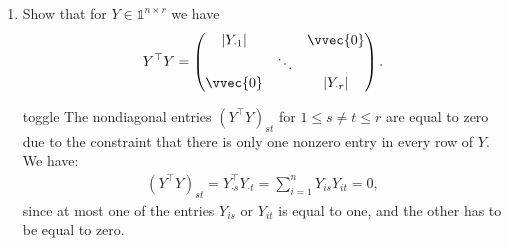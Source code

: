 \documentclass[letterpaper,10pt,english]{jupyterBook}
\begin{document}
\begin{enumerate}
\begin{sphinxuseclass}{toggle}
\sphinxAtStartPar
Now we update the centroids and compute the mean value of the data points which are in one cluster. For example, the first data point is the only point which is assigned to the first cluster, hence the new centroid of the first cluster will be that one point. The centroid of the second cluster is the mean of all remaining data points.
\begin{align*}
    X_1^\top = \begin{pmatrix}
        5 & 4 & 2 & 1\\
        3 & 1.5 & 4.8 & 2.8\\
    \end{pmatrix}.
\end{align*}
\sphinxAtStartPar
Now we update again the cluster assignments and get
\begin{align*}
    Y_1 = 
    \begin{pmatrix}
    1 & 0\\
    0 & 1\\
    0 & 1\\
    0 & 1\\
    1 & 0\\
    0 & 1
    \end{pmatrix}.
\end{align*}
\sphinxAtStartPar
Since \(Y_1=Y_0\), we have converged and we get the clustering identified by the matrices \(X_1\) and \(Y_1\).

\end{sphinxuseclass}
\item {} 
\sphinxAtStartPar
Show that for \(Y\in\mathbb{1}^{n\times r}\) we have
\begin{equation*}
\begin{split}Y^\top Y = \begin{pmatrix}
 \lvert Y_{\cdot 1}\rvert & & \vvec{0}\\
 & \ddots & \\
 \vvec{0}&& \lvert Y_{\cdot r}\rvert
 \end{pmatrix}.\end{split}
\end{equation*}

\begin{sphinxuseclass}{toggle}
\sphinxAtStartPar
The non\sphinxhyphen{}diagonal entries \((Y^\top Y)_{st}\) for \(1\leq s\neq t \leq r\) are equal to zero due to the constraint that there is only one nonzero entry in every row of \(Y\). We have:
\begin{align*}
(Y^\top Y)_{st} = Y_{\cdot s}^\top Y_{\cdot t} = \sum_{i=1}^n Y_{is}Y_{it} = 0,
\end{align*}
\sphinxAtStartPar
since at most one of the entries \(Y_{is}\) or \(Y_{it}\) is equal to one, and the other has to be equal to zero.


\end{sphinxuseclass}
\end{enumerate}
\end{document}
